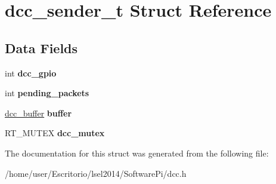 \hypertarget{structdcc__sender__t}{\section{dcc\-\_\-sender\-\_\-t \-Struct \-Reference}
\label{structdcc__sender__t}
}
\subsection*{\-Data \-Fields}
\begin{DoxyCompactItemize}
\item 
\hypertarget{structdcc__sender__t_af2c1eaf325bc7f7ad3b9b7786f67e879}{int {\bfseries dcc\-\_\-gpio}}\label{structdcc__sender__t_af2c1eaf325bc7f7ad3b9b7786f67e879}

\item 
\hypertarget{structdcc__sender__t_a79529dfa62070e8ebd1d937f1185ab40}{int {\bfseries pending\-\_\-packets}}\label{structdcc__sender__t_a79529dfa62070e8ebd1d937f1185ab40}

\item 
\hypertarget{structdcc__sender__t_acc8b35dd0c2450149f54443409074b9d}{\hyperlink{structdcc__buffer}{dcc\-\_\-buffer} {\bfseries buffer}}\label{structdcc__sender__t_acc8b35dd0c2450149f54443409074b9d}

\item 
\hypertarget{structdcc__sender__t_ac1cddbb20c0c48d2a6fa8fa0e4f07083}{\-R\-T\-\_\-\-M\-U\-T\-E\-X {\bfseries dcc\-\_\-mutex}}\label{structdcc__sender__t_ac1cddbb20c0c48d2a6fa8fa0e4f07083}

\end{DoxyCompactItemize}


\-The documentation for this struct was generated from the following file\-:\begin{DoxyCompactItemize}
\item 
/home/user/\-Escritorio/lsel2014/\-Software\-Pi/dcc.\-h\end{DoxyCompactItemize}
